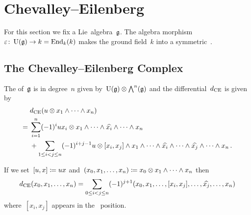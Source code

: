 \documentclass[a4paper,10pt,headings=standardclasses]{scrartcl}
\begin{document}
\section{Chevalley--Eilenberg}

For this section we fix a Lie~algebra~$\mathfrak{g}$.
The algebra morphism~$\varepsilon \colon \operatorname{U}(\mathfrak{g}) \to k = \operatorname{End}_k(k)$ makes the ground field~$k$ into a symmetric~{\bimodule{$\Univ(\glie)$}}.





\subsection{The Chevalley--Eilenberg Complex}

\begin{definition}
  The  of~$\mathfrak{g}$ is in degree~$n$ given by~$\operatorname{U}(\mathfrak{g}) \otimes \bigwedge^n(\mathfrak{g})$ and the differential~$d_{\text{CE}}$ is given by
  \begin{align*}
    {}&
    d_{\text{CE}}(u \otimes x_1 \wedge \dotsb \wedge x_n)
    \\
    ={}&
    \sum_{i=1}^n (-1)^i u x_i \otimes x_1 \wedge \dotsb \wedge \widehat{x_i} \wedge \dotsb \wedge x_n
    \\
    {}&
    +
    \sum_{1 \leq i < j \leq n}
    (-1)^{i+j-1}
    u \otimes [x_i, x_j] \wedge x_1 \wedge \dotsb \wedge \widehat{x_i} \wedge \dotsb \wedge \widehat{x_j} \wedge \dotsb \wedge x_n \,.
  \end{align*}
\end{definition}

\begin{remark}
  If we set~$[u, x] \coloneqq u x$ and~$(x_0, x_1, \dotsc, x_n) \coloneqq x_0 \otimes x_1 \wedge \dotsb \wedge x_n$ then
  \[
    d_{\text{CE}}(x_0, x_1, \dotsc, x_n)
    =
    \sum_{0 \leq i < j \leq n}
    (-1)^{j+1}
    (x_0, x_1, \dotsc, [x_i, x_j], \dotsc, \widehat{x_j}, \dotsc, x_n)
  \]
  where~$[x_i, x_j]$ appears in the~{} position.
\end{remark}

\end{document}
